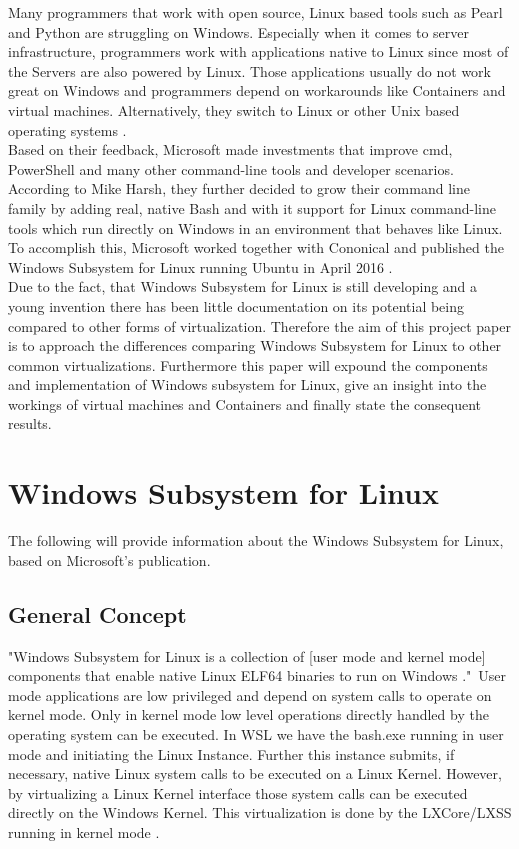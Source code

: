 \documentclass[utf8,biblatex, ngerman, english]{lni}
\begin{document}
Many programmers that work with open source, Linux based tools such as Pearl and Python are struggling on Windows. Especially when it comes to server infrastructure, programmers work with applications native to Linux since most of the Servers are also powered by Linux. Those applications usually do not work great on Windows and programmers depend on workarounds like Containers and virtual machines. Alternatively, they switch to Linux or other Unix based operating systems \cite{Ha16c}.\\
Based on their feedback, Microsoft made investments that improve cmd, PowerShell and many other command-line tools and developer scenarios. According to Mike Harsh, they further decided to grow their command line family by adding real, native Bash and with it support for Linux command-line tools which run directly on Windows in an environment that behaves like Linux.
To accomplish this, Microsoft worked together with Cononical and published the Windows Subsystem for Linux running Ubuntu in April 2016 \cite{Ha16c}. \\
Due to the fact, that Windows Subsystem for Linux is still developing and a young invention there has been little documentation on its potential being compared to other forms of virtualization. Therefore the aim of this project paper is to approach the differences comparing Windows Subsystem for Linux to other common virtualizations.  
Furthermore this paper will expound the components and implementation of Windows subsystem for Linux, give an insight into the workings of virtual machines and Containers and finally state the consequent results.


\section{Windows Subsystem for Linux}
The following will provide information about the Windows Subsystem for Linux, based on Microsoft's publication.

\subsection{General Concept}
"Windows Subsystem for Linux is a collection of [user mode and kernel mode] components that enable native Linux ELF64 binaries to run on Windows \cite{Ha16b}."\ User mode applications are low privileged and depend on system calls to operate on kernel mode. Only in kernel mode low level operations directly handled by the operating system can be executed. In WSL we have the bash.exe running in user mode and initiating the Linux Instance. Further this instance submits, if necessary, native Linux system calls to be executed on a Linux Kernel. However, by virtualizing a Linux Kernel interface those system calls can be executed directly on the Windows Kernel. This virtualization is done by the LXCore/LXSS running in kernel mode \cite{Ha16b}.
\end{document}
